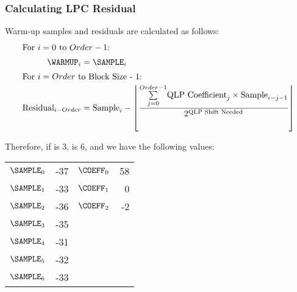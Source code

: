 
\clearpage

\subsubsection{Calculating LPC Residual}

Warm-up samples and residuals are calculated as follows:
\begin{align*}
\intertext{For $i = 0$ to $Order - 1$:}
\WARMUP_i &= \SAMPLE_i \\
\intertext{For $i = Order$ to Block Size - 1:}
\text{Residual}_{i - Order} &= \text{Sample}_i -
\left \lfloor \frac{\overset{Order - 1}{\underset{j = 0}{\sum}}
  \text{QLP Coefficient}_j \times \text{Sample}_{i - j - 1} }{
2 ^ \text{QLP Shift Needed}} \right \rfloor
\end{align*}
\par
\noindent
Therefore, if  is 3,  is 6,
and we have the following values:
\begin{tabular}{r r | r r}
$\SAMPLE_0$ & -37 & $\COEFF_0$ & 58 \\
$\SAMPLE_1$ & -33 & $\COEFF_1$ & 0 \\
$\SAMPLE_2$ & -36 & $\COEFF_2$ & -2 \\
$\SAMPLE_3$ & -35 & & \\
$\SAMPLE_4$ & -31 & & \\
$\SAMPLE_5$ & -32 & & \\
$\SAMPLE_6$ & -33 & & \\
\end{tabular}

\clearpage

